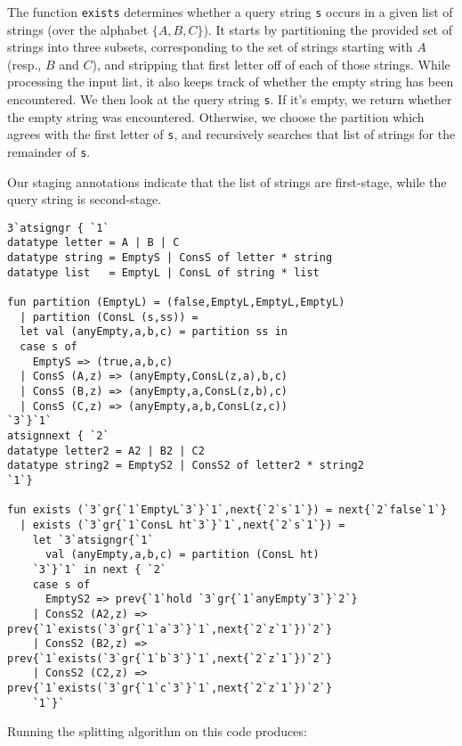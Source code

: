 The function {\tt exists} determines whether a query string \texttt{s} occurs in
a given list of strings (over the alphabet $\{A,B,C\}$). It starts by
partitioning the provided set of strings into three subsets, corresponding to
the set of strings starting with $A$ (resp., $B$ and $C$), and stripping that
first letter off of each of those strings. While processing the input list, it
also keeps track of whether the empty string has been encountered.
%
We then look at the query string \texttt{s}. If it's empty, we return whether
the empty string was encountered. Otherwise, we choose the partition which
agrees with the first letter of \texttt{s}, and recursively searches that list
of strings for the remainder of \texttt{s}.

Our staging annotations indicate that the list of strings are first-stage, while
the query string is second-stage.
\begin{lstlisting} 
3`atsigngr { `1`
datatype letter = A | B | C 
datatype string = EmptyS | ConsS of letter * string
datatype list   = EmptyL | ConsL of string * list

fun partition (EmptyL) = (false,EmptyL,EmptyL,EmptyL) 
  | partition (ConsL (s,ss)) = 
  let val (anyEmpty,a,b,c) = partition ss in 
  case s of 
    EmptyS => (true,a,b,c) 
  | ConsS (A,z) => (anyEmpty,ConsL(z,a),b,c) 
  | ConsS (B,z) => (anyEmpty,a,ConsL(z,b),c) 
  | ConsS (C,z) => (anyEmpty,a,b,ConsL(z,c)) 
`3`}`1`
atsignnext { `2`
datatype letter2 = A2 | B2 | C2
datatype string2 = EmptyS2 | ConsS2 of letter2 * string2
`1`}

fun exists (`3`gr{`1`EmptyL`3`}`1`,next{`2`s`1`}) = next{`2`false`1`} 
  | exists (`3`gr{`1`ConsL ht`3`}`1`,next{`2`s`1`}) = 
	let `3`atsigngr{`1`
	  val (anyEmpty,a,b,c) = partition (ConsL ht)
	`3`}`1` in next { `2`
	case s of 
	  EmptyS2 => prev{`1`hold `3`gr{`1`anyEmpty`3`}`2`} 
	| ConsS2 (A2,z) => prev{`1`exists(`3`gr{`1`a`3`}`1`,next{`2`z`1`})`2`} 
	| ConsS2 (B2,z) => prev{`1`exists(`3`gr{`1`b`3`}`1`,next{`2`z`1`})`2`}
	| ConsS2 (C2,z) => prev{`1`exists(`3`gr{`1`c`3`}`1`,next{`2`z`1`})`2`}  
	`1`}` 
\end{lstlisting}
Running the splitting algorithm on this code produces:
